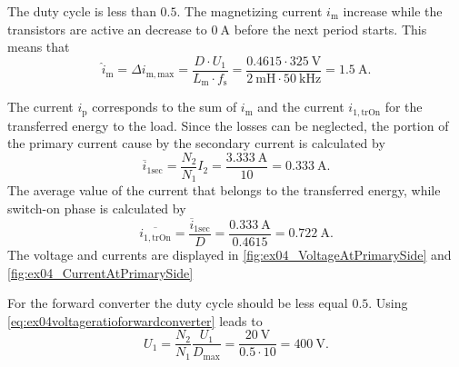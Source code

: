 \begin{solutionblock}
    The duty cycle is less than $0.5$. The magnetizing current $i_\mathrm{m}$ increase while the transistors are active an decrease 
    to $\SI{0}{\ampere}$ before the next period starts.
    This means that
    \begin{equation}
        \hat{i}_\mathrm{m}=\Delta i_\mathrm{m,max}= \frac{D \cdot U_\mathrm{1}}{L_\mathrm{m} \cdot f_\mathrm{s}} =
        \frac{0.4615 \cdot \SI{325}{\volt}}{\SI{2}{\milli\henry} \cdot \SI{50}{\kilo\hertz}} = \SI{1.5}{\ampere}.
    \end{equation}    
\end{solutionblock}


\begin{solutionblock}
    The current $i_\mathrm{p}$ corresponds to the sum of $i_\mathrm{m}$ and the current $i_\mathrm{1,trOn}$ for the transferred energy to the load.
    Since the losses can be neglected, the portion of the primary current cause by the secondary current is calculated by
    \begin{equation}
        \overline{i}_\mathrm{1sec}=\frac{N_\mathrm{2}}{N_\mathrm{1}}I_\mathrm{2}=\frac{\SI{3.333}{\ampere}}{10}=\SI{0.333}{\ampere}.
    \end{equation}    
    The average value of the current that belongs to the transferred energy, while switch-on phase is calculated by
    \begin{equation}
        \overline{i_\mathrm{1,trOn}}=\frac{\overline{i}_\mathrm{1sec}}{D}=\frac{\SI{0.333}{\ampere}}{0.4615}=\SI{0.722}{\ampere}.
    \end{equation}
    The voltage and currents are displayed in \autoref{fig:ex04_VoltageAtPrimarySide} and \autoref{fig:ex04_CurrentAtPrimarySide}
    
\end{solutionblock}
\FloatBarrier
{}
\begin{solutionblock}
    For the forward converter the duty cycle should be less equal $0.5$. Using \eqref{eq:ex04voltageratioforwardconverter} leads to
    \begin{equation}
        U_\mathrm{1}=\frac{N_\mathrm{2}}{N_\mathrm{1}}\frac{U_\mathrm{1}}{D_\mathrm{max}}=
        \frac{\SI{20}{\volt}}{0.5 \cdot 10}=\SI{400}{\volt}.
    \end{equation}
\end{solutionblock}


